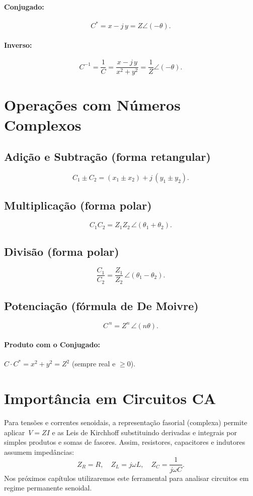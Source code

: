 \paragraph{Conjugado:}
\[
C^{\ast}=x-j\,y = Z\angle(-\theta).
\]

\paragraph{Inverso:}
\[
C^{-1} = \frac{1}{C} = \frac{x-j\,y}{x^{2}+y^{2}} = \frac{1}{Z}\angle(-\theta).
\]

\section{Operações com Números Complexos}

\subsection{Adição e Subtração (forma retangular)}
\[
C_{1}\pm C_{2} = (x_{1}\pm x_{2}) + j\,(y_{1}\pm y_{2}).
\]

\subsection{Multiplicação (forma polar)}
\[
C_{1} C_{2} = Z_{1}Z_{2}\,\angle(\theta_{1}+\theta_{2}).
\]

\subsection{Divisão (forma polar)}
\[
\frac{C_{1}}{C_{2}} = \frac{Z_{1}}{Z_{2}}\,\angle(\theta_{1}-\theta_{2}).
\]

\subsection{Potenciação (fórmula de De Moivre)}
\[
C^{\,n} = Z^{n}\,\angle(n\theta).
\]

\paragraph{Produto com o Conjugado:}
\(C\cdot C^{\ast}=x^{2}+y^{2}=Z^{2}\) (sempre real e \(\ge 0\)).

\section{Importância em Circuitos CA}
Para tensões e correntes senoidais, a representação fasorial (complexa) permite aplicar \(\,V=ZI\) e as Leis de Kirchhoff substituindo derivadas e integrais por simples produtos e somas de fasores. Assim, resistores, capacitores e indutores assumem impedâncias:
\[
Z_{R}=R,\quad
Z_{L}=j\omega L,\quad
Z_{C}=\frac{1}{j\omega C}.
\]
Nos próximos capítulos utilizaremos este ferramental para analisar circuitos em regime permanente senoidal.

